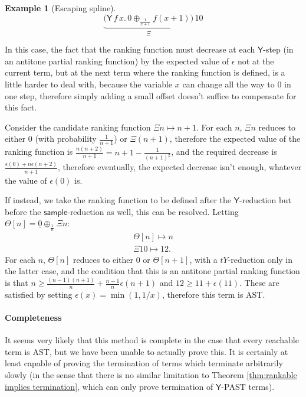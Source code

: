 \documentclass{article}
\newcommand{\tY}{\mathsf{Y}}
\newcommand{\tsample}{\mathsf{sample}}
\theoremstyle{definition}
\newtheorem{example}{Example}
\theoremstyle{lemma}
\theoremstyle{remark}
\begin{document}
\begin{example}[Escaping spline]
\label{ex:escaping spline}\citep[\S 5.4]{DBLP:journals/pacmpl/McIverMKK18}
\[
\underbrace{\big
(\tY \, f \, x . \,
0 \oplus_{\frac{1}{x+1}} f(x + 1) \big)}_{\Xi} 
\, 10
\]

In this case, the fact that the ranking function must decrease at each $\tY$-step (in an antitone partial ranking function) by the expected value of $\epsilon$ not at the current term, but at the next term where the ranking function is defined, is a little harder to deal with, because the variable $x$ can change all the way to $0$ in one step, therefore simply adding a small offset doesn't suffice to compensate for this fact.

Consider the candidate ranking function $\Xi n \mapsto n + 1$. For each $n$, $\Xi n$ reduces to either $0$ (with probability $\frac 1 {n + 1}$) or $\Xi (n + 1)$, therefore the expected value of the ranking function is $\frac{n(n+2)}{n+1} = n + 1 - \frac 1 {(n+1)^2}$, and the required decrease is $\frac{\epsilon(0) + n \epsilon(n + 2)}{n + 1}$, therefore eventually, the expected decrease isn't enough, whatever the value of $\epsilon(0)$ is.

If instead, we take the ranking function to be defined after the $\tY$-reduction but before the $\tsample$-reduction as well, this can be resolved. Letting $\Theta[n] = \underline 0 \oplus_{\frac 1 n} \Xi n$:
\begin{align*}
\Theta[n] \mapsto n \\
\Xi 10 \mapsto 12.
\end{align*}
For each $n$, $\Theta[n]$ reduces to either $0$ or $\Theta[n+1]$, with a $tY$-reduction only in the latter case, and the condition that this is an antitone partial ranking function is that $n \geq \frac{(n-1)(n+1)}{n} + \frac{n-1}{n} \epsilon(n+1)$ and $12 \geq 11 + \epsilon(11)$. These are satisfied by setting $\epsilon(x) = \min(1, 1/x)$, therefore this term is AST.
\end{example}

\paragraph{Completeness}
It seems very likely that this method is complete in the case that every reachable term is AST, but we have been unable to actually prove this. It is certainly at least capable of proving the termination of terms which terminate arbitrarily slowly (in the sense that there is no similar limitation to Theorem \ref{thm:rankable implies termination}, which can only prove termination of $\tY$-PAST terms).
\end{document}
